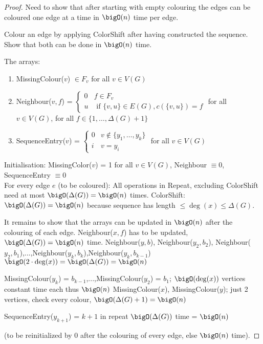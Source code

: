 \documentclass[aagt.tex]{subfiles}
\begin{document}
\begin{proof}
  Need to show that after starting with empty colouring the edges can be coloured one edge at a time in $\bigO(n)$ time per edge.
  
  Colour an edge by applying ColorShift after having constructed the sequence. 
  Show that both can be done in $\bigO(n)$ time.
  
  The arrays:
  \begin{enumerate}
    \item MissingColour($v$) $\in F_v$ for all $v \in V(G)$
    \item Neighbour($v,f$) = $\begin{cases} 0 & f \in F_v \\ u & \text{ if } \{v,u\} \in E(G), c(\{v,u\}) = f \end{cases}$
    for all $v \in V(G)$, for all $f \in \{1,\dots,\Delta(G)+1\}$
    \item SequenceEntry($v$) = $\begin{cases} 0 & v \notin \{y_1,\dots,y_k\} \\ i & v = y_i \end{cases}$ for all $v \in V(G)$
  \end{enumerate}
  
  Initialisation: MissingColor($v$) = 1 for all $v \in V(G)$, Neighbour $\equiv 0$, SequenceEntry $\equiv 0$\\
  For every edge $e$ (to be coloured): All operations in Repeat, excluding ColorShift need at most $\bigO(\Delta(G)) = \bigO(n)$ times.
  ColorShift: $\bigO(\Delta(G)) = \bigO(n)$ because sequence has length $\leq \deg(x) \leq \Delta(G)$.
  
  It remains to show that the arrays can be updated in $\bigO(n)$ after the colouring of each edge.
  Neighbour($x,f$) has to be updated, $\bigO(\Delta(G)) = \bigO(n)$ time.
  Neighbour($y,b$), Neighbour($y_2,b_2$), Neighbour($y_2,b_1$),...,Neighbour($y_k,b_k$),Neighbour($y_k,b_{k-1}$)
  $\bigO(2 \cdot \deg(x)) = \bigO(\Delta(G)) = \bigO(n)$
  
  MissingColour($y_k$) = $b_{k-1}$,...,MissingColour($y_2$) = $b_1$; $\bigO(\deg(x))$ vertices constant time each thus $\bigO(n)$
  MissingColour($x$), MissingColour($y$); just 2 vertices, check every colour, $\bigO(\Delta(G) + 1) = \bigO(n)$
  
  SequenceEntry($y_{k+1}$) = $k+1$ in repeat $\bigO(\Delta(G))$ time = $\bigO(n)$
  
  (to be reinitialized by $0$ after the colouring of every edge, else $\bigO(n)$ time).
\end{proof}
\end{document}
